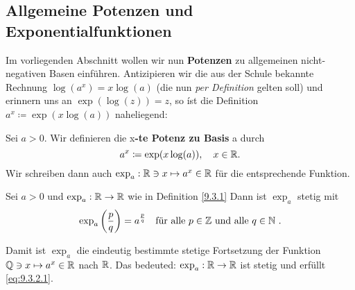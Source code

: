 \subsection{Allgemeine Potenzen und Exponentialfunktionen}
Im vorliegenden Abschnitt wollen wir nun \textbf{Potenzen} zu allgemeinen nicht-negativen Basen einführen.
Antizipieren wir  die aus der Schule bekannte Rechnung $ \log (a^x) = x \log (a) $ (die nun \textit{per Definition} gelten soll) und erinnern uns an $ \exp (\log (z)) = z $, so íst die Definition $ a^x \coloneqq \exp (x \log (a)) $ naheliegend:
\begin{subdefinition}
	Sei $ a > 0 $. Wir definieren die x\textbf{-te Potenz zu Basis} a durch
	\[
		a^x \coloneqq \exp (x \log (a) ), \quad x \in \mathbb{R} .
	\]
	Wir schreiben dann auch $ \exp_a : \mathbb{R} \ni x \mapsto a^x \in \mathbb{R}  $ für die entsprechende Funktion.
\end{subdefinition}

\begin{sublemma}
	Sei $ a > 0 $ und $ \exp_a : \mathbb{R} \to \mathbb{R}  $ wie in Definition \ref{9.3.1} Dann ist $ \exp_a $ stetig mit
	\begin{equation}
		\label{eq:9.3.2.1}
		\exp_a \left( \frac{ p }{ q }  \right) = a^{\frac{ p }{ q } } \quad \text{für alle $ p \in \mathbb{Z}  $ und alle $ q \in \mathbb{N}  $ } .
	\end{equation}
\end{sublemma}
Damit ist $ \exp_a $ die eindeutig bestimmte stetige Fortsetzung der Funktion $ \mathbb{Q} \ni x \mapsto a^x \in \mathbb{R}  $ nach $ \mathbb{R}  $.
Das bedeuted: $ \exp_a: \mathbb{R} \to \mathbb{R}  $ ist stetig und erfüllt \eqref{eq:9.3.2.1}.

